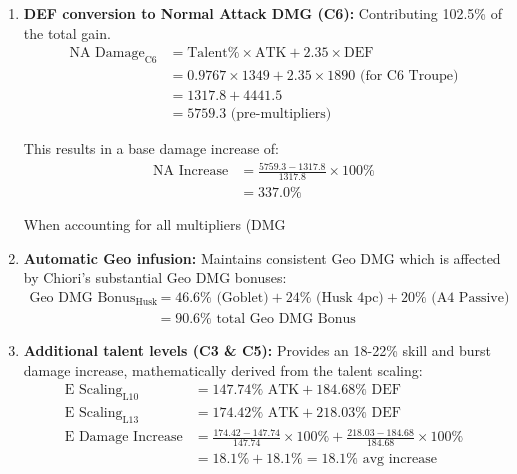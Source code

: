 \documentclass[12pt,a4paper]{article}
\begin{document}
\begin{enumerate}
    \item \textbf{DEF conversion to Normal Attack DMG (C6):} Contributing 102.5\% of the total gain.
        \begin{align}
        \text{NA Damage}_{\text{C6}} &= \text{Talent\%} \times \text{ATK} + 2.35 \times \text{DEF} \\
        &= 0.9767 \times 1349 + 2.35 \times 1890 \text{ (for C6 Troupe)} \\
        &= 1317.8 + 4441.5 \\
        &= 5759.3 \text{ (pre-multipliers)}
        \end{align}
        
        This results in a base damage increase of:
        \begin{align}
        \text{NA Increase} &= \frac{5759.3 - 1317.8}{1317.8} \times 100\% \\
        &= 337.0\%
        \end{align}
        
        When accounting for all multipliers (DMG%
    
    \item \textbf{Automatic Geo infusion:} Maintains consistent Geo DMG which is affected by Chiori's substantial Geo DMG bonuses:
        \begin{align}
        \text{Geo DMG Bonus}_{\text{Husk}} &= 46.6\% \text{ (Goblet)} + 24\% \text{ (Husk 4pc)} + 20\% \text{ (A4 Passive)} \\
        &= 90.6\% \text{ total Geo DMG Bonus}
        \end{align}
    
    \item \textbf{Additional talent levels (C3 & C5):} Provides an 18-22\% skill and burst damage increase, mathematically derived from the talent scaling:
        \begin{align}
        \text{E Scaling}_{\text{L10}} &= 147.74\% \text{ ATK} + 184.68\% \text{ DEF} \\
        \text{E Scaling}_{\text{L13}} &= 174.42\% \text{ ATK} + 218.03\% \text{ DEF} \\
        \text{E Damage Increase} &= \frac{174.42 - 147.74}{147.74} \times 100\% + \frac{218.03 - 184.68}{184.68} \times 100\% \\
        &= 18.1\% + 18.1\% = 18.1\% \text{ avg increase}
        \end{align}
        

\end{enumerate}
\end{document}
